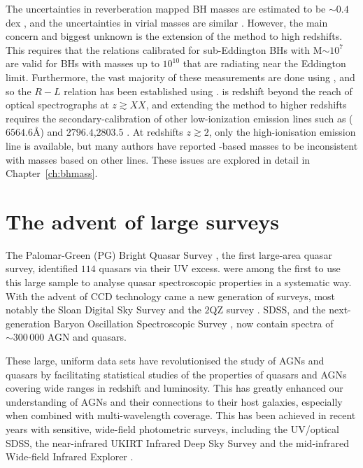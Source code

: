 The uncertainties in reverberation mapped BH masses are estimated to be $\sim 0.4$ dex \citep[e.g.][]{peterson10}, and the uncertainties in virial masses are similar \citep[e.g.][]{vestergaard06}.
However, the main concern and biggest unknown is the extension of the method to high redshifts. 
This requires that the relations calibrated for sub-Eddington BHs with M$\sim10^7$ are valid for BHs with masses up to $10^{10}$ that are radiating near the Eddington limit. 
Furthermore, the vast majority of these measurements are done using \hbns, and so the $R-L$ relation has been established using \hbns.
\hb is redshift beyond the reach of optical spectrographs at $z \gtrsim XX$, and extending the method to higher redshifts requires the secondary-calibration of other low-ionization emission lines such as \ha ($6564.6$\AA) and \ll$2796.4$,$2803.5$ \citep[e.g.][]{vestergaard02,mclure02,wu04,kollmeier06,onken08,wang09,rafiee11}.
At redshifts $z \gtrsim 2$, only the high-ionisation  emission line is available, but many authors have reported -based masses to be inconsistent with masses based on other lines. 
These issues are explored in detail in Chapter~\ref{ch:bhmass}.

\section{The advent of large surveys}

The Palomar-Green (PG) Bright Quasar Survey \citep[BQS;][]{schmidt83}, the first large-area quasar survey, identified $114$ quasars via their UV excess. 
\citet{boroson92} were among the first to use this large sample to analyse quasar spectroscopic properties in a systematic way.
With the advent of CCD technology came a new generation of surveys, most notably the Sloan Digital Sky Survey \citep[SDSS;][]{york00} and the $2$QZ survey \citep{croom04}. 
SDSS, and the next-generation Baryon Oscillation Spectroscopic Survey \citep[BOSS;][]{dawson13}, now contain spectra of $\sim300\,000$ AGN and quasars. 

These large, uniform data sets have revolutionised the study of AGNs and quasars by facilitating statistical studies of the properties of quasars and AGNs covering wide ranges in redshift and luminosity. 
This has greatly enhanced our understanding of AGNs and their connections to their host galaxies, especially when combined with multi-wavelength coverage. 
This has been achieved in recent years with sensitive, wide-field photometric surveys, including the UV/optical SDSS, the near-infrared UKIRT Infrared Deep Sky Survey \citep[UKIDSS;][]{lawrence07} and the mid-infrared Wide-field Infrared Explorer \citep[WISE;][]{wright10}.  

